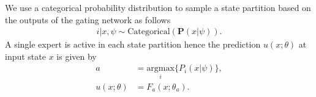 We use a categorical probability distribution to sample a state partition based
on the outputs of the gating network as follows~\cite{harkonen2022mixtures} 
\begin{align}
  i | x, \psi \sim \text{Categorical}(\mathbf{P}(x| \psi)). 
  \label{eq:gating_categorical}
\end{align}
%
%
A single expert is active in each state partition hence the prediction $u(x;
\theta)$ at input state $x$ is given by 
\begin{align*}
  a &= \underset{i}{\textrm{argmax}} \{ P_i(x | \psi) \},\\
  u(x; \theta) &= F_a(x; \theta_a).
\end{align*}


